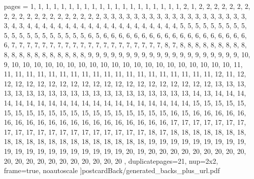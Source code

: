 \documentclass[letterpaper]{article}
\begin{document}

	pages = 	{ %
											1,	1,	1,	1,	1,	1,	1,	1,	1,	1,	1,	1,	1,	1,	1,	1,	1,	1,	1,	1,
											2,	1,	
											2,	2,	2,	2,	2,	2,	2,	2,	2,	2,	2,	2,	2,	2,	2,	2,	2,	2,	2,	2,
											3,	3,	3,	3,	3,	3,	3,	3,	3,	3,	3,	3,	3,	3,	3,	3,	3,	3,	3,	3,
											4,	3,	
											4,	4,	4,	4,	4,	4,	4,	4,	4,	4,	4,	4,	4,	4,	4,	4,	4,	4,	4,	4,
											5,	5,	5,	5,	5,	5,	5,	5,	5,	5,	5,	5,	5,	5,	5,	5,	5,	5,	5,	5,
											6,	5,
											6,	6,	6,	6,	6,	6,	6,	6,	6,	6,	6,	6,	6,	6,	6,	6,	6,	6,	6,	6,
											7,	7,	7,	7,	7,	7,	7,	7,	7,	7,	7,	7,	7,	7,	7,	7,	7,	7,	7,	7,
											8,	7,	
											8,	8,	8,	8,	8,	8,	8,	8,	8,	8,	8,	8,	8,	8,	8,	8,	8,	8,	8,	8,
											9,	9,	9,	9,	9,	9,	9,	9,	9,	9,	9,	9,	9,	9,	9,	9,	9,	9,	9,	9,
											10, 9,
											10,	10,	10,	10,	10,	10,	10,	10,	10,	10,	10,	10,	10,	10,	10,	10,	10,	10,	10,	10,
											11,	11,	11,	11,	11,	11,	11,	11,	11,	11,	11,	11,	11,	11,	11,	11,	11,	11,	11,	11,
											12,	11,
											12,	12,	12,	12,	12,	12,	12,	12,	12,	12,	12,	12,	12,	12,	12,	12,	12,	12,	12,	12,
											13,	13,	13,	13,	13,	13,	13,	13,	13,	13,	13,	13,	13,	13,	13,	13,	13,	13,	13,	13,
											14, 	13,
											14,	14,	14,	14,	14,	14,	14,	14,	14,	14,	14,	14,	14,	14,	14,	14,	14,	14,	14,	14,
											15,	15,	15,	15,	15,	15,	15,	15,	15,	15,	15,	15,	15,	15,	15,	15,	15,	15,	15,	15,
											16,	15,
											16,	16,	16,	16,	16,	16,	16,	16,	16,	16,	16,	16,	16,	16,	16,	16,	16,	16,	16,	16,
											17,	17,	17,	17,	17,	17,	17,	17,	17,	17,	17,	17,	17,	17,	17,	17,	17,	17,	17,	17,
											18,	17,
											18,	18,	18,	18,	18,	18,	18,	18,	18,	18,	18,	18,	18,	18,	18,	18,	18,	18,	18,	18,
											19,	19,	19,	19,	19,	19,	19,	19,	19,	19,	19,	19,	19,	19,	19,	19,	19,	19,	19,	19,
											20,	19,
											20,	20,	20,	20,	20,	20,	20,	20,	20,	20,	20,	20,	20,	20,	20,	20,	20,	20,	20,	20
										},
						duplicatepages=21,
						nup=2x2,
						frame=true,
						noautoscale
					]{postcardBack/generated_backs_plus_url.pdf}
\end{document}
